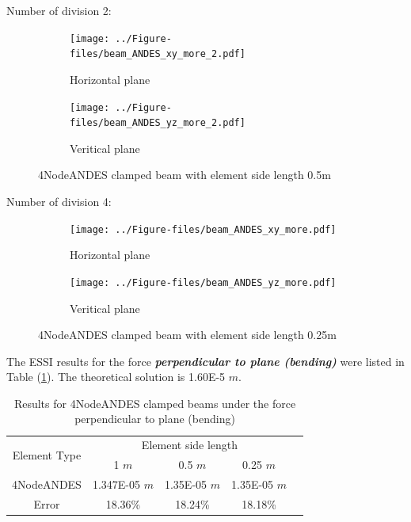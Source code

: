 \documentclass[fleqn,11pt]{article}
\begin{document}
Number of division 2:

\begin{figure}[H]
  \centering
    \begin{subfigure}{0.5\textwidth}
      \centering
      \texttt{[image: ../Figure-files/beam\_ANDES\_xy\_more\_2.pdf]}
      \caption{Horizontal plane}
    \end{subfigure}
    \begin{subfigure}{0.5\textwidth}
      \centering
      \texttt{[image: ../Figure-files/beam\_ANDES\_yz\_more\_2.pdf]}
      \caption{Veritical  plane}
    \end{subfigure}
  \caption{4NodeANDES clamped beam with element side length 0.5m }
  \label{fig 4NodeANDES clamped beams with element side length 0.5m}
\end{figure}






Number of division 4:

\begin{figure}[H]
  \centering
    \begin{subfigure}{0.5\textwidth}
      \centering
      \texttt{[image: ../Figure-files/beam\_ANDES\_xy\_more.pdf]}
      \caption{Horizontal plane}
    \end{subfigure}
    \begin{subfigure}{0.5\textwidth}
      \centering
      \texttt{[image: ../Figure-files/beam\_ANDES\_yz\_more.pdf]}
      \caption{Veritical  plane}
    \end{subfigure}
  \caption{4NodeANDES clamped beam with element side length 0.25m }
  \label{fig 4NodeANDES clamped beams with element side length 0.25m}
\end{figure}





The ESSI results for the force \textbf{\emph{perpendicular to plane (bending)}} were listed in Table (\ref{table Results for 4NodeANDES clamped beams with more elements}).  
The theoretical solution is 1.60E-5 $m$. 

\begin{table}[H]
  \centering
    \caption{Results for 4NodeANDES clamped beams under the force perpendicular to plane (bending)}
  \label{table Results for 4NodeANDES clamped beams with more elements}
  \begin{tabular}{|c|c|c|c|c|}
    \hline 
    \multirow{2}{*}{Element Type} 
       & \multicolumn{3}{|c|}{Element side length} \\ \cline{2-4}
       & 1 $m$ & 0.5 $m$ & 0.25 $m$ \\                              \hline
4NodeANDES & 1.347E-05 $m$ & 1.35E-05  $m$& 1.35E-05 $m$  \\ \hline
Error      & 18.36\%   & 18.24\%  & 18.18\%       \\ \hline
  \end{tabular}
\end{table}
\end{document}

